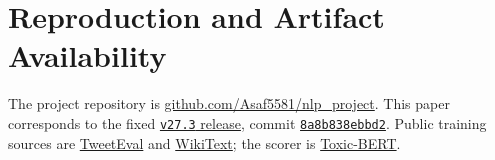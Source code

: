 \section{Reproduction and Artifact Availability}
\label{app:repro}
The project repository is \href{https://github.com/Asaf5581/nlp_project}{github.com/Asaf5581/nlp\_project}. This paper corresponds to the fixed \href{https://github.com/Asaf5581/nlp_project/tree/v27.3}{\texttt{v27.3} release}, commit \href{https://github.com/Asaf5581/nlp_project/commit/8a8b838ebbd2af81abea74f3d377bb85f81f20f8}{\texttt{8a8b838ebbd2}}. Public training sources are \href{https://huggingface.co/datasets/cardiffnlp/tweet_eval}{TweetEval} and \href{https://huggingface.co/datasets/Salesforce/wikitext}{WikiText}; the scorer is \href{https://huggingface.co/unitary/toxic-bert}{Toxic-BERT}.

